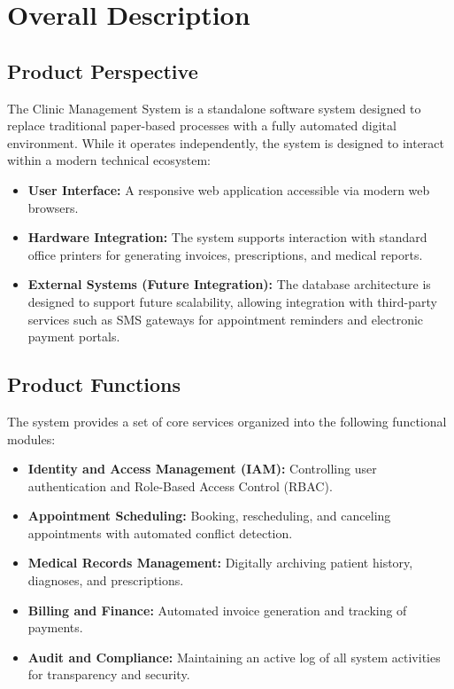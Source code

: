 \section{Overall Description}

\subsection{Product Perspective}

The Clinic Management System is a standalone software system designed to replace traditional paper-based processes with a fully automated digital environment. While it operates independently, the system is designed to interact within a modern technical ecosystem:

\begin{itemize}
	\item \textbf{User Interface:} A responsive web application accessible via modern web browsers.
	\item \textbf{Hardware Integration:} The system supports interaction with standard office printers for generating invoices, prescriptions, and medical reports.
	\item \textbf{External Systems (Future Integration):} The database architecture is designed to support future scalability, allowing integration with third-party services such as SMS gateways for appointment reminders and electronic payment portals.
\end{itemize}

\subsection{Product Functions}

The system provides a set of core services organized into the following functional modules:

\begin{itemize}
	\item \textbf{Identity and Access Management (IAM):} Controlling user authentication and Role-Based Access Control (RBAC).
	\item \textbf{Appointment Scheduling:} Booking, rescheduling, and canceling appointments with automated conflict detection.
	\item \textbf{Medical Records Management:} Digitally archiving patient history, diagnoses, and prescriptions.
	\item \textbf{Billing and Finance:} Automated invoice generation and tracking of payments.
	\item \textbf{Audit and Compliance:} Maintaining an active log of all system activities for transparency and security.
\end{itemize}

